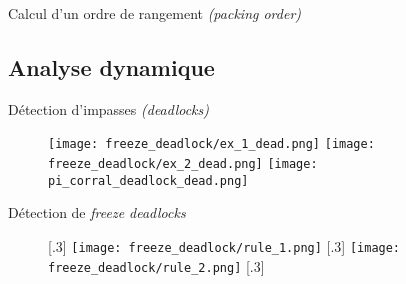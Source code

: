             \begin{frame}{Calcul d'un ordre de rangement \textit{(packing order)}}
            \end{frame}

        \subsection{Analyse dynamique}

            \begin{frame}{Détection d'impasses \textit{(deadlocks)}}
                \begin{figure}
                    \centering
                        {\texttt{[image: freeze\_deadlock/ex\_1\_dead.png]}}
                        {\texttt{[image: freeze\_deadlock/ex\_2\_dead.png]}}
                        {\texttt{[image: pi\_corral\_deadlock\_dead.png]}}
                \end{figure}
            \end{frame}

            \begin{frame}{Détection de \textit{freeze deadlocks}}
                \begin{figure}
                    \centering
                    [.3\textwidth]
                    {\texttt{[image: freeze\_deadlock/rule\_1.png]}}
                    [.3\textwidth]
                    {\texttt{[image: freeze\_deadlock/rule\_2.png]}}
                    [.3\textwidth] {
                    }
                \end{figure}
            \end{frame}

